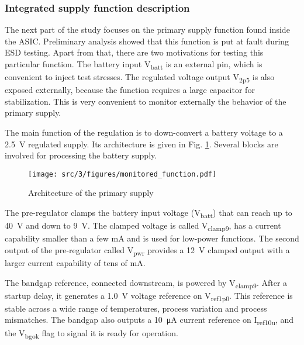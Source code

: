 \subsubsection{Integrated supply function description}
\label{sec:supply-desc}

The next part of the study focuses on the primary supply function found inside the ASIC.
Preliminary analysis showed that this function is put at fault during ESD testing.
Apart from that, there are two motivations for testing this particular function.
The battery input V\textsubscript{batt} is an external pin, which is convenient to inject test stresses.
The regulated voltage output V\textsubscript{2p5} is also exposed externally, because the function requires a large capacitor for stabilization.
This is very convenient to monitor externally the behavior of the primary supply.

The main function of the regulation is to down-convert a battery voltage to a \SI{2.5}{\volt} regulated supply.
Its architecture is given in Fig. \ref{fig:monitored_function}.
Several blocks are involved for processing the battery supply.

\begin{figure}[!h]
  \centering
  \texttt{[image: src/3/figures/monitored\_function.pdf]}
  \caption{Architecture of the primary supply}
  \label{fig:monitored_function}
\end{figure}

The pre-regulator clamps the battery input voltage (V\textsubscript{batt}) that can reach up to \SI{40}{\volt} and down to \SI{9}{\volt}.
The clamped voltage is called V\textsubscript{clamp9}, has a current capability smaller than a few mA and is used for low-power functions.
The second output of the pre-regulator called V\textsubscript{pwr} provides a \SI{12}{\volt} clamped output with a larger current capability of tens of mA.

The bandgap reference, connected downstream, is powered by V\textsubscript{clamp9}.
After a startup delay, it generates a \SI{1.0}{\volt} voltage reference on V\textsubscript{ref1p0}.
This reference is stable across a wide range of temperatures, process variation and process mismatches.
The bandgap also outputs a \SI{10}{\micro\ampere} current reference on I\textsubscript{ref10u}, and the V\textsubscript{bgok} flag to signal it is ready for operation.

